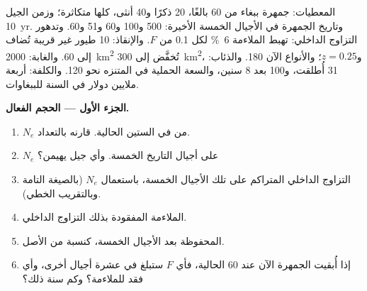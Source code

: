 \begin{problem}
\label{pb:b3:conservation-biology:1}
المعطيات: جمهرة ببغاء من 60 بالغًا، 20 ذكرًا و40 أنثى، كلها
متكاثرة؛ وزمن الجيل \qty{10}{yr}. وتاريخ الجمهرة في الأجيال
الخمسة الأخيرة: 500 و100 و60 و51 و60. وتدهور التزاوج الداخلي:
تهبط الملاءمة \qty{6}{\%} لكل \qty{0.1}{} من $F$. والإنقاذ: 10
طيور غير قريبة تُضاف إلى 60. والغابة: \qty{2000}{km^2} تُخفَّض إلى
\qty{300}{km^2}، و$z = 0.25$؛ والأنواع الآن 180. والذئاب: 31 أُطلقت، و100
بعد 8 سنين، والسعة الحملية في المتنزه نحو 120. والكلفة: أربعة
ملايين دولار في السنة للببغاوات.

\medskip
\noindent\textbf{الجزء الأول --- الحجم الفعال.}
\begin{enumerate}
  \item $N_{e}$ من  في الستين الحالية. قارنه
        بالتعداد.
  \item $N_{e}$  على أجيال التاريخ الخمسة.
        وأي جيل يهيمن؟
  \item التزاوج الداخلي المتراكم على تلك الأجيال الخمسة،
        باستعمال $N_{e}$  (بالصيغة التامة وبالتقريب الخطي).
  \item الملاءمة المفقودة بذلك التزاوج الداخلي.
  \item {} المحفوظة بعد الأجيال الخمسة، كنسبة
        من الأصل.
  \item إذا أُبقيت الجمهرة الآن عند 60 
        الحالية، فأي $F$ ستبلغ في عشرة أجيال أخرى، وأي
        فقد للملاءمة؟ وكم سنة ذلك؟
\end{enumerate}


\end{problem}
